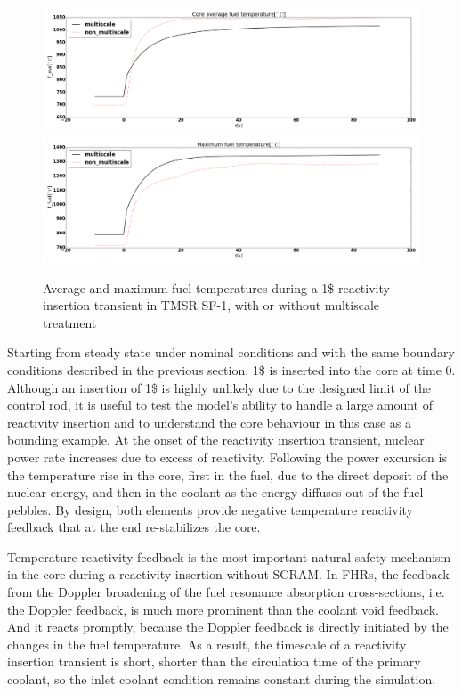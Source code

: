 \documentclass{elsarticle}
\begin{document}
\begin{figure}
    \centering
    \includegraphics[width=\textwidth]{images/diffusion/tmsr/RI/compare_multiscale/T_fuel_ave.png}
    \includegraphics[width=\textwidth]{images/diffusion/tmsr/RI/compare_multiscale/T_fuel_max.png}
    \caption{Average and maximum fuel temperatures during a 1\$ reactivity insertion transient in TMSR SF-1, with or without multiscale treatment}
    \label{fig:multi_comp_fuel_TMSR}
\end{figure}

Starting from steady state under nominal conditions and with the same boundary conditions described in the previous section, 1\$ is inserted into the core at time 0. Although an insertion of 1\$ is highly unlikely due to the designed limit of the control rod, it is useful to test the model's ability to handle a large amount of reactivity insertion and to understand the core behaviour in this case as a bounding example. At the onset of the reactivity insertion transient, nuclear power rate increases due to excess of reactivity. Following the power excursion is the temperature rise in the core, first in the fuel, due to the direct deposit of the nuclear energy, and then in the coolant as the energy diffuses out of the fuel pebbles. By design, both elements provide negative temperature reactivity feedback that at the end re-stabilizes the core. 

Temperature reactivity feedback is the most important natural safety mechanism in the core during a reactivity insertion without SCRAM. In FHRs, the feedback from the Doppler broadening of the fuel resonance absorption cross-sections, i.e. the Doppler feedback, is much more prominent than the coolant void feedback. And it reacts promptly, because the Doppler feedback is directly initiated by the changes in the fuel temperature. As a result, the timescale of a reactivity insertion transient is short, shorter than the circulation time of the primary coolant, so the inlet coolant condition remains constant during the simulation.
\end{document}
